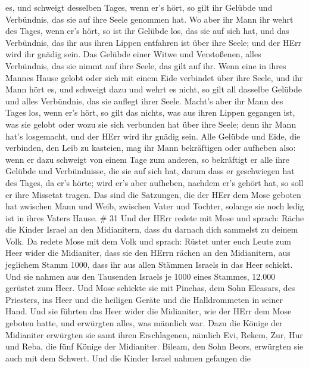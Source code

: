 es, und schweigt desselben Tages, wenn er's hört, so gilt ihr Gelübde
und Verbündnis, das sie auf ihre Seele genommen hat.  Wo
aber ihr Mann ihr wehrt des Tages, wenn er's hört, so ist ihr Gelübde
los, das sie auf sich hat, und das Verbündnis, das ihr aus ihren Lippen
entfahren ist über ihre Seele; und der HErr wird ihr gnädig sein.
 Das Gelübde einer Witwe und Verstoßenen, alles Verbündnis,
das sie nimmt auf ihre Seele, das gilt auf ihr.  Wenn eine
in ihres Mannes Hause gelobt oder sich mit einem Eide verbindet über
ihre Seele,  und ihr Mann hört es, und schweigt dazu und
wehrt es nicht, so gilt all dasselbe Gelübde und alles Verbündnis, das
sie auflegt ihrer Seele.  Macht's aber ihr Mann des Tages
los, wenn er's hört, so gilt das nichts, was aus ihren Lippen gegangen
ist, was sie gelobt oder wozu sie sich verbunden hat über ihre Seele;
denn ihr Mann hat's losgemacht, und der HErr wird ihr gnädig sein.
 Alle Gelübde und Eide, die verbinden, den Leib zu
kasteien, mag ihr Mann bekräftigen oder aufheben also: 
wenn er dazu schweigt von einem Tage zum anderen, so bekräftigt er alle
ihre Gelübde und Verbündnisse, die sie auf sich hat, darum dass er
geschwiegen hat des Tages, da er's hörte;  wird er's aber
aufheben, nachdem er's gehört hat, so soll er ihre Missetat tragen.
 Das sind die Satzungen, die der HErr dem Mose geboten hat
zwischen Mann und Weib, zwischen Vater und Tochter, solange sie noch
ledig ist in ihres Vaters Hause. \# 31  Und der HErr redete
mit Mose und sprach:  Räche die Kinder Israel an den
Midianitern, dass du darnach dich sammelst zu deinem Volk. 
Da redete Mose mit dem Volk und sprach: Rüstet unter euch Leute zum Heer
wider die Midianiter, dass sie den HErrn rächen an den Midianitern,
 aus jeglichem Stamm 1000, dass ihr aus allen Stämmen
Israels in das Heer schickt.  Und sie nahmen aus den
Tausenden Israels je 1000 eines Stammes, 12.000 gerüstet zum Heer.
 Und Mose schickte sie mit Pinehas, dem Sohn Eleasars, des
Priesters, ins Heer und die heiligen Geräte und die Halldrommeten in
seiner Hand.  Und sie führten das Heer wider die Midianiter,
wie der HErr dem Mose geboten hatte, und erwürgten alles, was männlich
war.  Dazu die Könige der Midianiter erwürgten sie samt
ihren Erschlagenen, nämlich Evi, Rekem, Zur, Hur und Reba, die fünf
Könige der Midianiter. Bileam, den Sohn Beors, erwürgten sie auch mit
dem Schwert.  Und die Kinder Israel nahmen gefangen die
